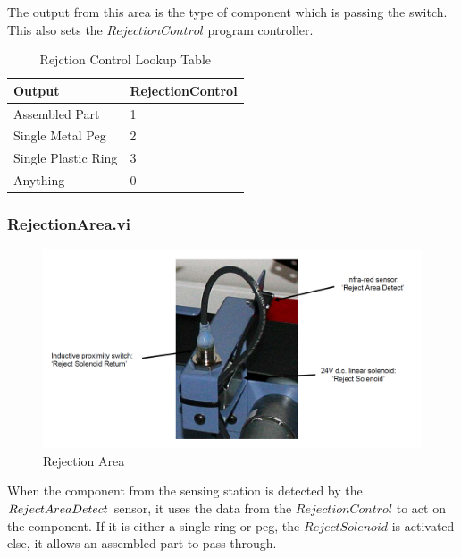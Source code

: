 \documentclass[12pt]{article}
\begin{document}
    The output from this area is the type of component which is passing the switch. 
    This also sets the $RejectionControl$ program
    controller.

    \begin{table}[!ht]
      \centering
      \begin{tabular}{|l|l|}
      \hline
      \textbf{Output}     & \textbf{RejectionControl} \\ \hline
      Assembled Part      & 1                         \\ \hline
      Single Metal Peg    & 2                         \\ \hline
      Single Plastic Ring & 3                         \\ \hline
      Anything            & 0                         \\ \hline
      \end{tabular}
      \caption{Rejction Control Lookup Table}
      \label{tab:rejout}
    \end{table}

  \subsubsection{RejectionArea.vi}
    \begin{figure}[H]
      \centering
      \includegraphics[width=\linewidth]{images/reject-area.png}
      \caption{Rejection Area\cite{ictmanual}}
    \end{figure}

    When the component from the sensing station is detected by the $Reject\-Area\-Detect$
    sensor, it uses the data from the $RejectionControl$ to act on the component. 
    If it is either a single ring or peg, the $RejectSolenoid$ is activated else, it allows an
    assembled part to pass through.
\end{document}
